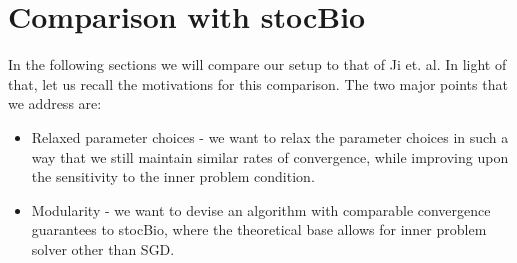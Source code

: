 \documentclass[11pt, twoside]{report}
\begin{document}
\section{Comparison with stocBio}
In the following sections we will compare our setup to that of Ji et. al. In light of that, let us recall the motivations for this comparison. The two major points that we address are:
\begin{itemize}
    \item Relaxed parameter choices - we want to relax the parameter choices in such a way that we still maintain similar rates of convergence, while improving upon the sensitivity to the inner problem condition.
    \item Modularity - we want to devise an algorithm with comparable convergence guarantees to stocBio, where the theoretical base allows for inner problem solver other than SGD.
\end{itemize}

\end{document}
